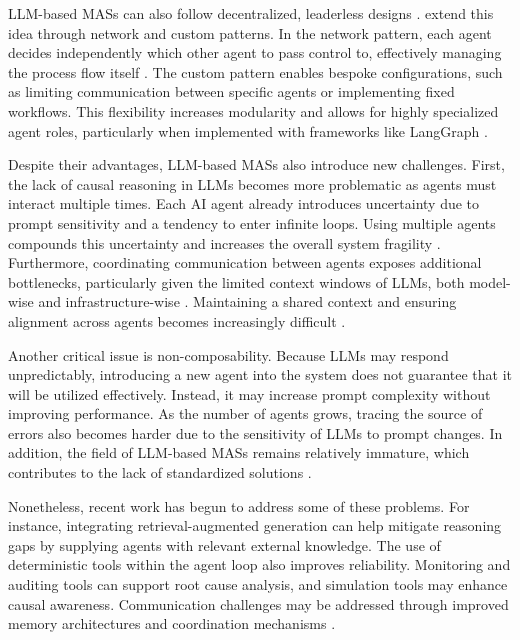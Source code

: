 \documentclass[a4paper,oneside,bibliography=totoc]{scrbook}
\begin{document}
\ac{LLM}-based \acp{MAS} can also follow decentralized, leaderless designs \cite{OpenAI2025,LangChain2025b}. \citet{LangChain2025b} extend this idea through network and custom patterns. In the network pattern, each agent decides independently which other agent to pass control to, effectively managing the process flow itself \cite{LangChain2025b,OpenAI2025}. The custom pattern enables bespoke configurations, such as limiting communication between specific agents or implementing fixed workflows. This flexibility increases modularity and allows for highly specialized agent roles, particularly when implemented with frameworks like LangGraph \cite{LangChain2025b}.

Despite their advantages, \ac{LLM}-based \acp{MAS} also introduce new challenges. First, the lack of causal reasoning in \acp{LLM} becomes more problematic as agents must interact multiple times. Each \ac{AI} agent already introduces uncertainty due to prompt sensitivity and a tendency to enter infinite loops. Using multiple agents compounds this uncertainty and increases the overall system fragility \cite{Sapkota2025}. Furthermore, coordinating communication between agents exposes additional bottlenecks, particularly given the limited context windows of \acp{LLM}, both model-wise and infrastructure-wise \cite{Kwon2023}. Maintaining a shared context and ensuring alignment across agents becomes increasingly difficult \cite{Sapkota2025,Han2025}.

Another critical issue is non-composability. Because \acp{LLM} may respond unpredictably, introducing a new agent into the system does not guarantee that it will be utilized effectively. Instead, it may increase prompt complexity without improving performance. As the number of agents grows, tracing the source of errors also becomes harder due to the sensitivity of \acp{LLM} to prompt changes. In addition, the field of \ac{LLM}-based \acp{MAS} remains relatively immature, which contributes to the lack of standardized solutions \cite{Sapkota2025}.

Nonetheless, recent work has begun to address some of these problems. For instance, integrating retrieval-augmented generation can help mitigate reasoning gaps by supplying agents with relevant external knowledge. The use of deterministic tools within the agent loop also improves reliability. Monitoring and auditing tools can support root cause analysis, and simulation tools may enhance causal awareness. Communication challenges may be addressed through improved memory architectures and coordination mechanisms \cite{Sapkota2025}.
\end{document}
